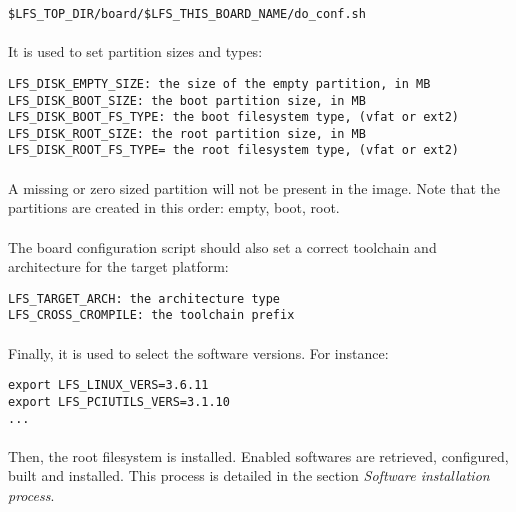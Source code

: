 \documentclass[a4paper, 11pt]{article}
\begin{document}
\begin{lstlisting}[frame=tb]
$LFS_TOP_DIR/board/$LFS_THIS_BOARD_NAME/do_conf.sh
\end{lstlisting}

\paragraph{}
It is used to set partition sizes and types:\\

\begin{lstlisting}[frame=tb]
LFS_DISK_EMPTY_SIZE: the size of the empty partition, in MB
LFS_DISK_BOOT_SIZE: the boot partition size, in MB
LFS_DISK_BOOT_FS_TYPE: the boot filesystem type, (vfat or ext2)
LFS_DISK_ROOT_SIZE: the root partition size, in MB
LFS_DISK_ROOT_FS_TYPE= the root filesystem type, (vfat or ext2)
\end{lstlisting}

\paragraph{}
A missing or zero sized partition will not be present in the image. Note that
the partitions are created in this order: empty, boot, root.

\paragraph{}
The board configuration script should also set a correct toolchain and
architecture for the target platform:\\

\begin{lstlisting}[frame=tb]
LFS_TARGET_ARCH: the architecture type
LFS_CROSS_CROMPILE: the toolchain prefix
\end{lstlisting}

\paragraph{}
Finally, it is used to select the software versions. For instance:\\
\begin{lstlisting}[frame=tb]
export LFS_LINUX_VERS=3.6.11
export LFS_PCIUTILS_VERS=3.1.10
...
\end{lstlisting}

\paragraph{}
Then, the root filesystem is installed. Enabled softwares are retrieved,
configured, built and installed. This process is detailed in the section
\textit{Software installation process}.
\end{document}
